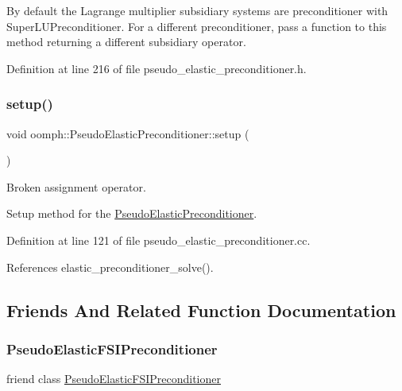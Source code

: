 By default the Lagrange multiplier subsidiary systems are preconditioner with Super\+L\+U\+Preconditioner. For a different preconditioner, pass a function to this method returning a different subsidiary operator. 



Definition at line 216 of file pseudo\+\_\+elastic\+\_\+preconditioner.\+h.

\mbox{\label{classoomph_1_1PseudoElasticPreconditioner_a69909eef3e1530ca7faf48c653ec7327}} 
\subsubsection{\texorpdfstring{setup()}{setup()}}
{\footnotesize\ttfamily void oomph\+::\+Pseudo\+Elastic\+Preconditioner\+::setup (\begin{DoxyParamCaption}{ }\end{DoxyParamCaption})}



Broken assignment operator. 

Setup method for the \hyperlink{classoomph_1_1PseudoElasticPreconditioner}{Pseudo\+Elastic\+Preconditioner}. 

Definition at line 121 of file pseudo\+\_\+elastic\+\_\+preconditioner.\+cc.



References elastic\+\_\+preconditioner\+\_\+solve().



\subsection{Friends And Related Function Documentation}
\mbox{\label{classoomph_1_1PseudoElasticPreconditioner_aaaea2b4795566f81945597254305249d}} 
\subsubsection{\texorpdfstring{Pseudo\+Elastic\+F\+S\+I\+Preconditioner}{PseudoElasticFSIPreconditioner}}
{\footnotesize\ttfamily friend class \hyperlink{classoomph_1_1PseudoElasticFSIPreconditioner}{Pseudo\+Elastic\+F\+S\+I\+Preconditioner}\hspace{0.3cm}{\ttfamily [friend]}}



